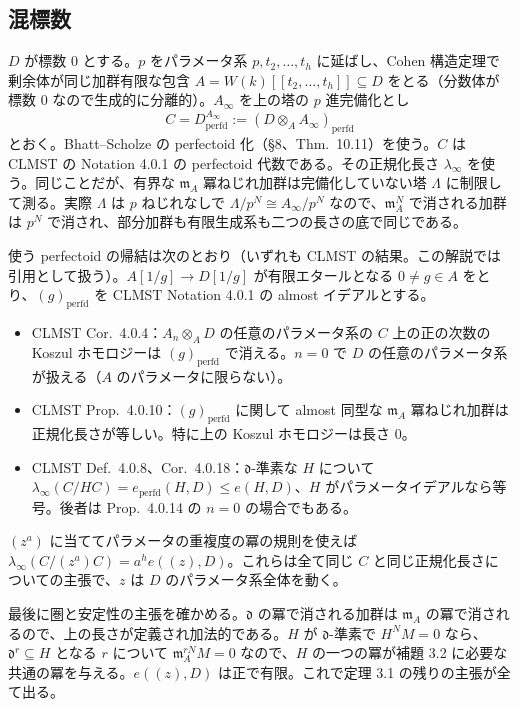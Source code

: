 \documentclass[11pt,a4paper]{ltjsarticle}
\theoremstyle{plain}
\theoremstyle{definition}
\newcommand{\m}{\mathfrak{m}}
\newcommand{\dd}{\mathfrak{d}}
\newcommand{\perfd}{\mathrm{perfd}}
\begin{document}
\subsection{混標数}
$D$ が標数 $0$ とする。$p$ をパラメータ系 $p,t_2,\dots,t_h$ に延ばし、Cohen 構造定理で剰余体が同じ加群有限な包含 $A = W(k)[[t_2,\dots,t_h]]\subseteq D$ をとる（分数体が標数 $0$ なので生成的に分離的）。$A_\infty$ を上の塔の $p$ 進完備化とし
\[
  C = D^{A_\infty}_\perfd := (D\otimes_AA_\infty)_\perfd
\]
とおく。Bhatt--Scholze の perfectoid 化（\S8、Thm.~10.11）を使う。$C$ は CLMST の Notation 4.0.1 の perfectoid 代数である。その正規化長さ $\lambda_\infty$ を使う。同じことだが、有界な $\m_A$ 冪ねじれ加群は完備化していない塔 $\Lambda$ に制限して測る。実際 $\Lambda$ は $p$ ねじれなしで $\Lambda/p^N\cong A_\infty/p^N$ なので、$\m_A^N$ で消される加群は $p^N$ で消され、部分加群も有限生成系も二つの長さの底で同じである。

使う perfectoid の帰結は次のとおり（いずれも CLMST の結果。この解説では引用として扱う）。$A[1/g]\to D[1/g]$ が有限エタールとなる $0\ne g\in A$ をとり、$(g)_\perfd$ を CLMST Notation 4.0.1 の almost イデアルとする。
\begin{itemize}
  \item CLMST Cor.~4.0.4：$A_n\otimes_AD$ の任意のパラメータ系の $C$ 上の正の次数の Koszul ホモロジーは $(g)_\perfd$ で消える。$n = 0$ で $D$ の任意のパラメータ系が扱える（$A$ のパラメータに限らない）。
  \item CLMST Prop.~4.0.10：$(g)_\perfd$ に関して almost 同型な $\m_A$ 冪ねじれ加群は正規化長さが等しい。特に上の Koszul ホモロジーは長さ $0$。
  \item CLMST Def.~4.0.8、Cor.~4.0.18：$\dd$-準素な $H$ について $\lambda_\infty(C/HC) = e_\perfd(H,D)\le e(H,D)$、$H$ がパラメータイデアルなら等号。後者は Prop.~4.0.14 の $n = 0$ の場合でもある。
\end{itemize}
$(z^a)$ に当ててパラメータの重複度の冪の規則を使えば $\lambda_\infty(C/(z^a)C) = a^he((z),D)$。これらは全て同じ $C$ と同じ正規化長さについての主張で、$z$ は $D$ のパラメータ系全体を動く。

最後に圏と安定性の主張を確かめる。$\dd$ の冪で消される加群は $\m_A$ の冪で消されるので、上の長さが定義され加法的である。$H$ が $\dd$-準素で $H^NM = 0$ なら、$\dd^r\subseteq H$ となる $r$ について $\m_A^{rN}M = 0$ なので、$H$ の一つの冪が補題 3.2 に必要な共通の冪を与える。$e((z),D)$ は正で有限。これで定理 3.1 の残りの主張が全て出る。

\end{document}
